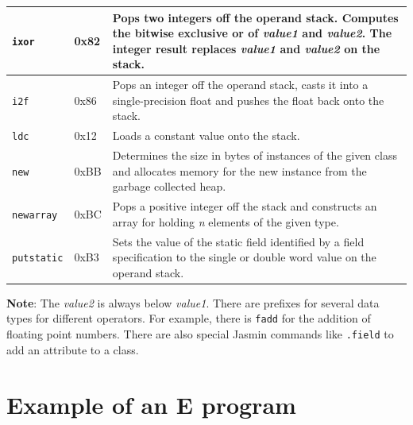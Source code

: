 \begin{table}[bth]
\begin{tabular}{|l|l|p{10cm}|}
		\texttt{ixor} & 0x82 & Pops two integers off the operand stack. Computes the bitwise exclusive or of \emph{value1} and \emph{value2}. The integer result replaces \emph{value1} and \emph{value2} on the stack. \\\hline
		\texttt{i2f} & 0x86 & Pops an integer off the operand stack, casts it into a single-precision float and pushes the float back onto the stack.  \\\hline
		\texttt{ldc} & 0x12 & Loads a constant value onto the stack. \\\hline
		\texttt{new} & 0xBB & Determines the size in bytes of instances of the given class and allocates memory for the new instance from the garbage collected heap. \\\hline
		\texttt{newarray} & 0xBC & Pops a positive integer off the stack and constructs an array for holding \emph{n} elements of the given type. \\\hline
		\texttt{putstatic} & 0xB3 & Sets the value of the static field identified by a field specification to the single or double word value on the operand stack. \\\hline
	\end{tabular}
\end{table}

\textbf{Note}: The \emph{value2} is always below \emph{value1}. There are prefixes for several data types for different operators. For example, there is \texttt{fadd} for the addition of floating point numbers. There are also special Jasmin commands like \texttt{.field} to add an attribute to a class.

\newpage

\section*{Example of an E program}
\label{sec:eprogram}

